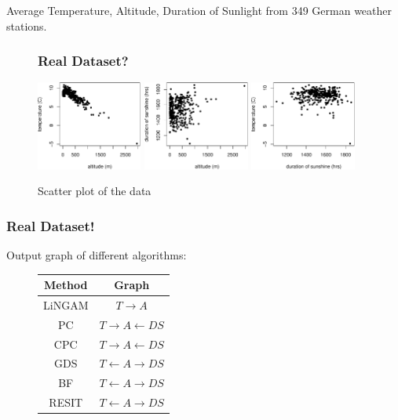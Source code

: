 \documentclass{beamer}
\begin{document}
\begin{frame}
Average Temperature, Altitude, Duration of Sunlight from 349 German weather stations.

\begin{figure}[h!]
\frametitle{Real Dataset?}
	\begin{center}
		\includegraphics[width=0.31\textwidth]{experimentAltTempcut}
		\hspace{0.02\textwidth}
		\includegraphics[width=0.31\textwidth]{experimentAltSuncut}
		\hspace{0.02\textwidth}
		\includegraphics[width=0.31\textwidth]{experimentSunTempcut}
	\end{center}
	\caption{Scatter plot of the data}
	\label{fig:alt}
\end{figure}

\end{frame}
\begin{frame}
\frametitle{Real Dataset!}
Output graph of different algorithms:
\vspace{1cm}
\begin{figure}
	\centering
		\begin{tabular}{| c| c |}
			\hline
			Method & Graph \\
			\hline\hline
			LiNGAM & $T \rightarrow A$ \\
			\hline
			PC &  $T \rightarrow A \leftarrow DS$ \\
			\hline
			CPC& $T \rightarrow A \leftarrow DS$ \\
			\hline
			GDS& $T \leftarrow A \rightarrow DS$\\
			\hline
			BF& $T \leftarrow A \rightarrow DS$\\
			\hline
			RESIT&$T \leftarrow A \rightarrow DS$\\
			\hline
		\end{tabular}
	\end{figure}
\end{frame}
\end{document}
